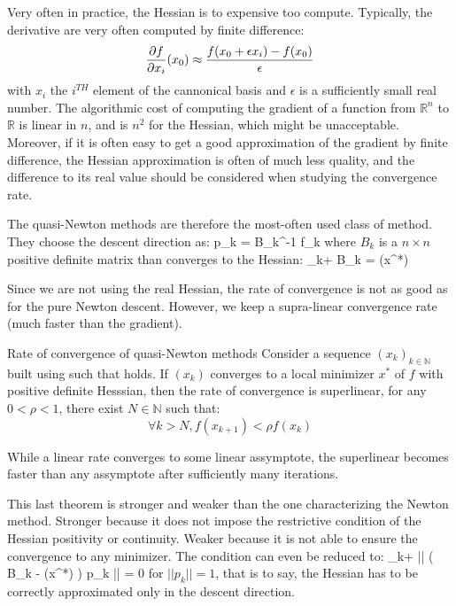 \documentclass{book}
\begin{document}
Very often in practice, the Hessian is to expensive too compute. Typically, the derivative are very often computed by finite difference:
\[ \frac{\partial{f}}{\partial{x_i}} (x_0) \approx \frac{f(x_0 + \epsilon x_i) - f(x_0)}{\epsilon} \]
with $x_i$ the $i^{TH}$ element of the cannonical basis and $\epsilon$ is a sufficiently small real number. The algorithmic cost of computing the gradient of a function from $\mathbb{R}^n$ to $\mathbb{R}$ is linear in $n$, and is $n^2$ for the Hessian, which might be unacceptable. Moreover, if it is often easy to get a good approximation of the gradient by finite difference, the Hessian approximation is often of much less quality, and the difference to its real value should be considered when studying the convergence rate.

The quasi-Newton methods are therefore the most-often used class of method. They choose the descent direction as:
 p_k = B_k^{-1} \nabla f_k \EOUT
where $B_k$ is a $n\times n$ positive definite matrix than converges to the Hessian:
 \lim_{k\rightarrow+\infty} B_k = (x^*) \EOUT

Since we are not using the real Hessian, the rate of convergence is not as good as for the pure Newton descent. However, we keep a supra-linear convergence rate (much faster than the gradient).

\begin{theorem}{Rate of convergence of quasi-Newton methods}
Consider a sequence $(x_k)_{k\in\mathbb{N}}$ built using  such that  holds. If $(x_k)$ converges to a local minimizer $x^*$ of $f$ with positive definite Hesssian, then the rate of convergence is superlinear, \mie for any $0<\rho <1$, there exist $N\in\mathbb{N}$ such that:
\[ \forall k>N, f(x_{k+1}) < \rho f(x_k) \]
\end{theorem}
While a linear rate converges to some linear assymptote, the superlinear becomes faster than any assymptote after sufficiently many iterations.

This last theorem is stronger and weaker than the one characterizing the Newton method. Stronger because it does not impose the restrictive condition of the Hessian positivity or continuity. Weaker because it is not able to ensure the convergence to any minimizer. The condition  can even be reduced to:
 \lim_{k\rightarrow+\infty} || \big( B_k - (x^*) \big) p_k || = 0 \EOUT
for $||p_k||=1$, that is to say, the Hessian has to be correctly approximated only in the descent direction.
\end{document}
